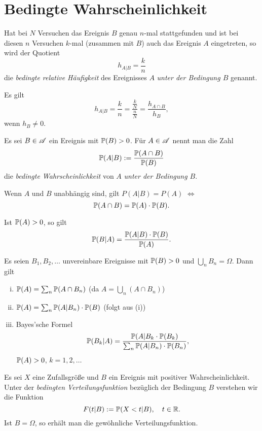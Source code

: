 \section{Bedingte Wahrscheinlichkeit}
\begin{defn}
  Hat bei $N$ Versuchen das Ereignis $B$ genau $n$-mal stattgefunden und ist bei
  diesen $n$ Versuchen $k$-mal (zusammen mit $B$) auch das Ereignis $A$
  eingetreten, so wird der Quotient
  \[ h_{A|B} = \frac{k}{n} \]
  die \emph{bedingte relative Häufigkeit} des Ereignisses $A$ \emph{unter der
    Bedingung $B$} genannt.

  Es gilt
  \[ h_{A|B} = \frac{k}{n} = \frac{\frac{k}{N}}{\frac{n}{N}} = \frac{h_{A \cap
        B}}{h_B}, \]
  wenn $h_B \ne 0$.
\end{defn}

\begin{defn}
  Es sei $B \in \mathscr{A}$ ein Ereignis mit $\mathbb{P}(B) > 0$. Für $A \in \mathscr{A}$ nennt man
  die Zahl
  \[ \mathbb{P}( A | B ) := \frac{\mathbb{P}(A \cap B)}{\mathbb{P}(B)} \]
  die \emph{bedingte Wahrscheinlichkeit} von $A$ \emph{unter der Bedingung $B$}.

  Wenn $A$ und $B$ unabhängig sind, gilt $P(A|B) = P(A)$ $\Leftrightarrow$
  \[ \mathbb{P}( A \cap B ) = \mathbb{P}(A) \cdot \mathbb{P}(B). \]

  Ist $\mathbb{P}(A) > 0$, so gilt
  \[ \mathbb{P}(B|A) = \frac{\mathbb{P}(A|B) \cdot \mathbb{P}(B)}{\mathbb{P}(A)}. \]
\end{defn}

\begin{thm}
  Es seien $B_1, B_2, \ldots$ unvereinbare Ereignisse mit $\mathbb{P}(B) > 0$ und
  $\bigcup_n B_n = \Omega$. Dann gilt
  \begin{enumerate}[(i)]
  \item $\mathbb{P}(A) = \sum_n \mathbb{P}(A \cap B_n)$ \hfill
    {\footnotesize (da $A = \bigcup_n (A \cap B_n)$)}
  \item $\mathbb{P}(A) = \sum_n \mathbb{P}( A | B_n ) \cdot \mathbb{P}(B)$ \hfill
    {\footnotesize (folgt aus (i))}
  \item Bayes'sche Formel
    \[ \mathbb{P}(B_k | A) = \frac{\mathbb{P}(A|B_k \cdot \mathbb{P}(B_k)}{\sum_n \mathbb{P}(A | B_n) \cdot
        \mathbb{P}(B_n)}, \]
    $\mathbb{P}(A) > 0$, $k= 1, 2, \ldots$
  \end{enumerate}
\end{thm}

\begin{defn}
  Es sei $X$ eine Zufallsgröße und $B$ ein Ereignis mit positiver
  Wahrscheinlichkeit. Unter der \emph{bedingten Verteilungsfunktion} bezüglich
  der Bedingung $B$ verstehen wir die Funktion
  \[ F( t | B ) := \mathbb{P}( X < t | B ), \quad t \in \mathbb{R}. \]
  Ist $B = \Omega$, so erhält man die gewöhnliche Verteilungsfunktion.
\end{defn}

